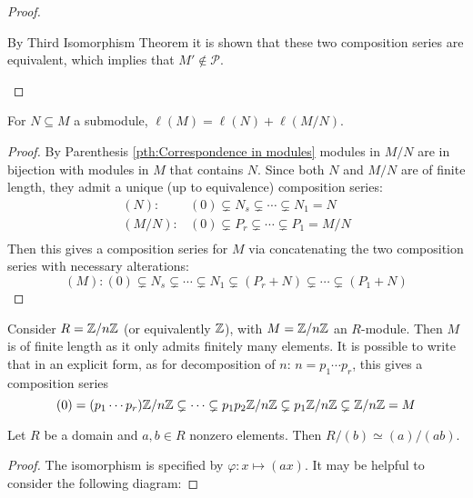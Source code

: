\begin{proof}
\begin{itemize}
        By Third Isomorphism Theorem it is shown that these two composition series are equivalent, which implies that $M'\notin \mathcal{P}$.
    \end{itemize}
\end{proof}

\begin{corollary}
    For $N\subseteq M$ a submodule, $\ell(M) = \ell(N) + \ell(M/N)$.
\end{corollary}

\begin{proof}
    By Parenthesis \ref{pth:Correspondence in modules} modules in $M/N$ are in bijection with modules in $M$ that contains $N$. Since both $N$ and $M/N$ are of finite length, they admit a unique (up to equivalence) composition series:
    \[
    \begin{array}{cc}
        (N): & (0) \subsetneq N_s \subsetneq \cdots \subsetneq N_1 = N \\
        (M/N): & (0) \subsetneq P_r \subsetneq \cdots \subsetneq P_1 = M/N \\
    \end{array}
    \]
    Then this gives a composition series for $M$ via concatenating the two composition series with necessary alterations:
    \[
        (M): (0) \subsetneq N_s \subsetneq \cdots \subsetneq N_1 \subsetneq (P_r + N) \subsetneq \cdots \subsetneq (P_1 + N)
    \]
\end{proof}

\begin{remark}
    Consider $R = \mathbb{Z}/n\mathbb{Z}$ (or equivalently $\mathbb{Z}$), with $M = \mathbb{Z}/n\mathbb{Z}$ an $R$-module. Then $M$ is of finite length as it only admits finitely many elements. It is possible to write that in an explicit form, as for decomposition of $n$: $n = p_1\cdots p_r$, this gives a composition series
    \[
        (0) = (p_1\cdots p_r)\mathbb{Z}/n\mathbb{Z} \subsetneq \cdots \subsetneq p_1p_2\mathbb{Z}/n\mathbb{Z} \subsetneq p_1\mathbb{Z}/n\mathbb{Z} \subsetneq \mathbb{Z}/n\mathbb{Z} = M
    \]
\end{remark}

\begin{parenthesis}
    Let $R$ be a domain and $a, b\in R$ nonzero elements. Then $R/(b) \simeq (a)/(ab)$. 
\end{parenthesis}

\begin{proof}
    The isomorphism is specified by $\varphi: x\mapsto (ax)$. It may be helpful to consider the following diagram:
    
    \begin{minipage}{\linewidth}
        \centering
    \end{minipage}
\end{proof}

